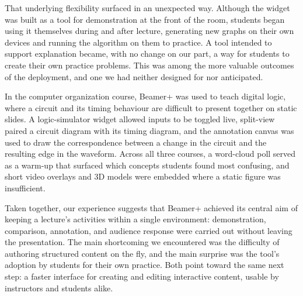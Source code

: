 \documentclass[sigconf]{acmart}
\begin{document}
That underlying flexibility surfaced in an unexpected way. Although the widget was built as a tool for demonstration at the front of the room, students began using it themselves during and after lecture, generating new graphs on their own devices and running the algorithm on them to practice. A tool intended to support explanation became, with no change on our part, a way for students to create their own practice problems. This was among the more valuable outcomes of the deployment, and one we had neither designed for nor anticipated.

In the computer organization course, Beamer+ was used to teach digital logic, where a circuit and its timing behaviour are difficult to present together on static slides. A logic-simulator widget allowed inputs to be toggled live, split-view paired a circuit diagram with its timing diagram, and the annotation canvas was used to draw the correspondence between a change in the circuit and the resulting edge in the waveform. Across all three courses, a word-cloud poll served as a warm-up that surfaced which concepts students found most confusing, and short video overlays and 3D models were embedded where a static figure was insufficient.

Taken together, our experience suggests that Beamer+ achieved its central aim of keeping a lecture's activities within a single environment: demonstration, comparison, annotation, and audience response were carried out without leaving the presentation. The main shortcoming we encountered was the difficulty of authoring structured content on the fly, and the main surprise was the tool's adoption by students for their own practice. Both point toward the same next step: a faster interface for creating and editing interactive content, usable by instructors and students alike.
\end{document}
